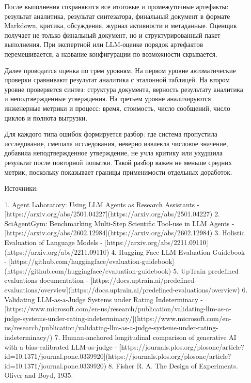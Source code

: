 После выполнения сохраняются все итоговые и промежуточные артефакты: результат аналитика, результат синтезатора, финальный документ в формате Markdown, критика, обсуждения, журнал активности и метаданные. Оценщик получает не только финальный документ, но и структурированный пакет выполнения. При экспертной или LLM-оценке порядок артефактов перемешивается, а название конфигурации по возможности скрывается.

Далее проводится оценка по трем уровням. На первом уровне автоматические проверки сравнивают результат аналитика с эталонной таблицей. На втором уровне проверяется синтез: структура документа, верность результату аналитика и неподтвержденные утверждения. На третьем уровне анализируются инженерные метрики и процесс: время, стоимость, число сообщений, число циклов и полнота выгрузки.

Для каждого типа ошибок формируется разбор: где система пропустила исследование, смешала исследования, неверно извлекла числовое значение, добавила неподтвержденное утверждение, не учла критику или ухудшила результат после повторной попытки. Такой разбор важен не меньше средних метрик, поскольку показывает границы применимости отдельных доработок.

Источники:

1. Agent Laboratory: Using LLM Agents as Research Assistants - [https://arxiv.org/abs/2501.04227](https://arxiv.org/abs/2501.04227)
2. SciAgentGym: Benchmarking Multi-Step Scientific Tool-use in LLM Agents - [https://arxiv.org/abs/2602.12984](https://arxiv.org/abs/2602.12984)
3. Holistic Evaluation of Language Models - [https://arxiv.org/abs/2211.09110](https://arxiv.org/abs/2211.09110)
4. Hugging Face LLM Evaluation Guidebook - [https://github.com/huggingface/evaluation-guidebook](https://github.com/huggingface/evaluation-guidebook)
5. UpTrain predefined evaluations documentation - [https://docs.uptrain.ai/predefined-evaluations/overview](https://docs.uptrain.ai/predefined-evaluations/overview)
6. Validating LLM-as-a-Judge Systems under Rating Indeterminacy - [https://www.microsoft.com/en-us/research/publication/validating-llm-as-a-judge-systems-under-rating-indeterminacy/](https://www.microsoft.com/en-us/research/publication/validating-llm-as-a-judge-systems-under-rating-indeterminacy/)
7. Human-anchored longitudinal comparison of generative AI with a bias-calibrated LLM-as-judge - [https://journals.plos.org/plosone/article?id=10.1371/journal.pone.0339920](https://journals.plos.org/plosone/article?id=10.1371/journal.pone.0339920)
8. Fisher R. A. The Design of Experiments. Oliver and Boyd, 1935.

